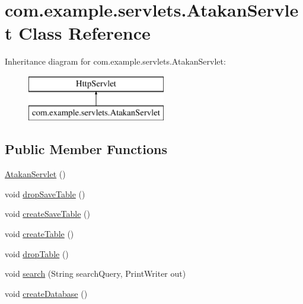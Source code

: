 \hypertarget{classcom_1_1example_1_1servlets_1_1_atakan_servlet}{}\section{com.\+example.\+servlets.\+Atakan\+Servlet Class Reference}
\label{classcom_1_1example_1_1servlets_1_1_atakan_servlet}
Inheritance diagram for com.\+example.\+servlets.\+Atakan\+Servlet\+:\begin{figure}[H]
\begin{center}
\leavevmode
\includegraphics[height=2.000000cm]{classcom_1_1example_1_1servlets_1_1_atakan_servlet}
\end{center}
\end{figure}
\subsection*{Public Member Functions}
\begin{DoxyCompactItemize}
\item 
\hyperlink{classcom_1_1example_1_1servlets_1_1_atakan_servlet_a87e2532962ccd888df5a6e642ab6c047}{Atakan\+Servlet} ()
\item 
void \hyperlink{classcom_1_1example_1_1servlets_1_1_atakan_servlet_a6e8d25b648ac5982a2841efc984554f0}{drop\+Save\+Table} ()
\item 
void \hyperlink{classcom_1_1example_1_1servlets_1_1_atakan_servlet_a35d1a337e700fae93e6c1bc1e8caa3be}{create\+Save\+Table} ()
\item 
void \hyperlink{classcom_1_1example_1_1servlets_1_1_atakan_servlet_a58d74748199c3d7e4c4fc4a4dc4a4a9e}{create\+Table} ()
\item 
void \hyperlink{classcom_1_1example_1_1servlets_1_1_atakan_servlet_a8d4a40b18eb4548d16c072701c7eae16}{drop\+Table} ()
\item 
void \hyperlink{classcom_1_1example_1_1servlets_1_1_atakan_servlet_a12f494a4d42fef16831bba384424cba5}{search} (String search\+Query, Print\+Writer out)
\item 
void \hyperlink{classcom_1_1example_1_1servlets_1_1_atakan_servlet_ac43c5246ad7474fb542684e70b884f14}{create\+Database} ()
\end{DoxyCompactItemize}

